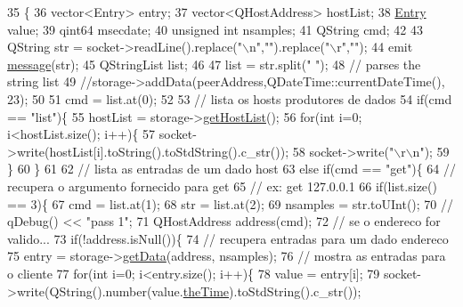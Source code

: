 \begin{DoxyCode}
35                         \{
36   vector<Entry> entry;
37   vector<QHostAddress> hostList;
38   \mbox{\hyperlink{struct_entry}{Entry}} value;
39   qint64 msecdate;
40   \textcolor{keywordtype}{unsigned} \textcolor{keywordtype}{int} nsamples;
41   QString cmd;
42 
43   QString str = socket->readLine().replace(\textcolor{stringliteral}{"\(\backslash\)n"},\textcolor{stringliteral}{""}).replace(\textcolor{stringliteral}{"\(\backslash\)r"},\textcolor{stringliteral}{""});
44   emit \mbox{\hyperlink{class_my_thread_ae49528d4ec1b2208240f707f5aa74adf}{message}}(str);
45   QStringList list;
46 
47   list = str.split(\textcolor{stringliteral}{" "});
48   \textcolor{comment}{// parses the string list}
49   \textcolor{comment}{//storage->addData(peerAddress,QDateTime::currentDateTime(), 23);}
50 
51   cmd = list.at(0);
52 
53   \textcolor{comment}{// lista os hosts produtores de dados}
54   \textcolor{keywordflow}{if}(cmd == \textcolor{stringliteral}{"list"})\{
55     hostList = storage->\mbox{\hyperlink{class_data_storage_a05e60f4e62fb68f588e3f381d40b6bbd}{getHostList}}();
56     \textcolor{keywordflow}{for}(\textcolor{keywordtype}{int} i=0; i<hostList.size(); i++)\{
57       socket->write(hostList[i].toString().toStdString().c\_str());
58       socket->write(\textcolor{stringliteral}{"\(\backslash\)r\(\backslash\)n"});
59     \}
60   \}
61 
62   \textcolor{comment}{// lista as entradas de um dado host}
63   \textcolor{keywordflow}{else} \textcolor{keywordflow}{if}(cmd == \textcolor{stringliteral}{"get"})\{
64     \textcolor{comment}{// recupera o argumento fornecido para get}
65     \textcolor{comment}{// ex: get 127.0.0.1}
66     \textcolor{keywordflow}{if}(list.size() == 3)\{
67       cmd = list.at(1);
68       str = list.at(2);
69       nsamples = str.toUInt();
70      \textcolor{comment}{// qDebug() << "pass 1";}
71       QHostAddress address(cmd);
72       \textcolor{comment}{// se o endereco for valido...}
73       \textcolor{keywordflow}{if}(!address.isNull())\{
74         \textcolor{comment}{// recupera entradas para um dado endereco}
75         entry = storage->\mbox{\hyperlink{class_data_storage_a716fe9bd808cb8ea9f0ef153bf01a633}{getData}}(address, nsamples);
76         \textcolor{comment}{// mostra as entradas para o cliente}
77         \textcolor{keywordflow}{for}(\textcolor{keywordtype}{int} i=0; i<entry.size(); i++)\{
78           value = entry[i];
79           socket->write(QString().number(value.\mbox{\hyperlink{struct_entry_a0a78d616ccc342ef6c34d849288d7c85}{theTime}}).toStdString().c\_str());

\end{DoxyCode}
